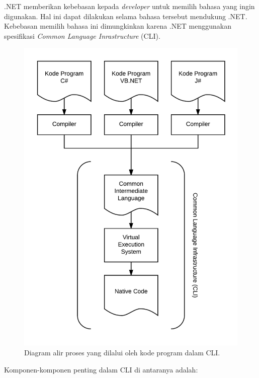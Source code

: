 .NET memberikan kebebasan kepada \textit{developer} untuk memilih bahasa yang ingin digunakan. Hal ini dapat dilakukan selama bahasa tersebut mendukung .NET. Kebebasan memilih bahasa ini dimungkinkan karena .NET menggunakan spesifikasi \textit{Common Language Inrastructure} (CLI).

\begin{figure}[h]
    \centering
    \includegraphics[scale=0.2]{Gambar/CLI.png}
    \caption[Diagram alir proses yang dilalui oleh kode program dalam CLI.]{Diagram alir proses yang dilalui oleh kode program dalam CLI.} 
    \label{fig:cli}
\end{figure}

Komponen-komponen penting dalam CLI di antaranya adalah\cite{CLI:2016}:

